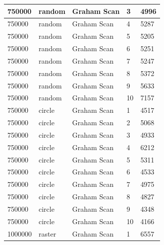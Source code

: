 \documentclass[12pt]{article}
\begin{document}
\begin{longtable}{|l|l|l|l|l|}
750000       & random            & Graham Scan & 3          & 4996                          \\ \hline
750000       & random            & Graham Scan & 4          & 5287                          \\ \hline
750000       & random            & Graham Scan & 5          & 5205                          \\ \hline
750000       & random            & Graham Scan & 6          & 5251                          \\ \hline
750000       & random            & Graham Scan & 7          & 5247                          \\ \hline
750000       & random            & Graham Scan & 8          & 5372                          \\ \hline
750000       & random            & Graham Scan & 9          & 5633                          \\ \hline
750000       & random            & Graham Scan & 10         & 7157                          \\ \hline
750000       & circle            & Graham Scan & 1          & 4517                          \\ \hline
750000       & circle            & Graham Scan & 2          & 5068                          \\ \hline
750000       & circle            & Graham Scan & 3          & 4933                          \\ \hline
750000       & circle            & Graham Scan & 4          & 6212                          \\ \hline
750000       & circle            & Graham Scan & 5          & 5311                          \\ \hline
750000       & circle            & Graham Scan & 6          & 4533                          \\ \hline
750000       & circle            & Graham Scan & 7          & 4975                          \\ \hline
750000       & circle            & Graham Scan & 8          & 4827                          \\ \hline
750000       & circle            & Graham Scan & 9          & 4348                          \\ \hline
750000       & circle            & Graham Scan & 10         & 4166                          \\ \hline
1000000      & raster            & Graham Scan & 1          & 6557                          \\ \hline

\end{longtable}
\end{document}
